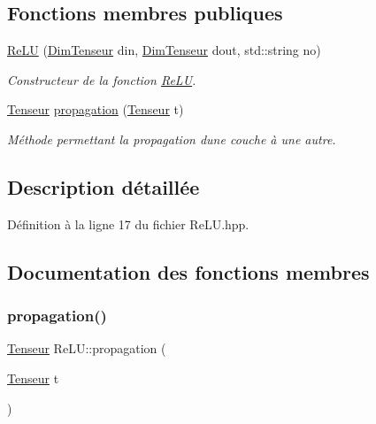 \subsection*{Fonctions membres publiques}
\begin{DoxyCompactItemize}
\item 
\mbox{\label{class_re_l_u_a818c59b2b84777493cdfb399d896559c}} 
\hyperlink{class_re_l_u_a818c59b2b84777493cdfb399d896559c}{Re\+LU} (\hyperlink{class_dim_tenseur}{Dim\+Tenseur} din, \hyperlink{class_dim_tenseur}{Dim\+Tenseur} dout, std\+::string no)
\begin{DoxyCompactList}\small\item\em Constructeur de la fonction \hyperlink{class_re_l_u}{Re\+LU}. \end{DoxyCompactList}\item 
\hyperlink{class_tenseur}{Tenseur} \hyperlink{class_re_l_u_a0d42917d6a9124571b0b467c81bce38a}{propagation} (\hyperlink{class_tenseur}{Tenseur} t)
\begin{DoxyCompactList}\small\item\em Méthode permettant la propagation d\textquotesingle{}une couche à une autre. \end{DoxyCompactList}\end{DoxyCompactItemize}


\subsection{Description détaillée}


Définition à la ligne 17 du fichier Re\+L\+U.\+hpp.



\subsection{Documentation des fonctions membres}
\mbox{\label{class_re_l_u_a0d42917d6a9124571b0b467c81bce38a}} 
\subsubsection{\texorpdfstring{propagation()}{propagation()}}
{\footnotesize\ttfamily \hyperlink{class_tenseur}{Tenseur} Re\+L\+U\+::propagation (\begin{DoxyParamCaption}\item[{\hyperlink{class_tenseur}{Tenseur}}]{t }\end{DoxyParamCaption})\hspace{0.3cm}{\ttfamily [virtual]}}



